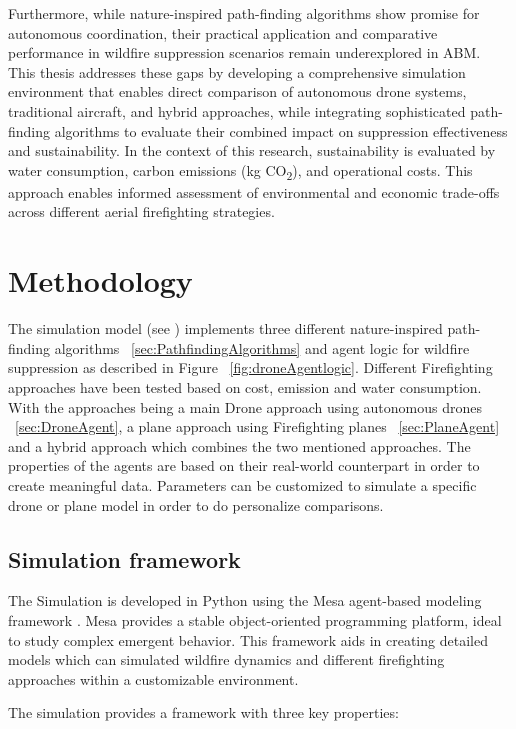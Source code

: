 \documentclass[twoside]{article}
\begin{document}
Furthermore, while nature-inspired path-finding algorithms show promise for autonomous coordination, their practical application and comparative performance in wildfire suppression scenarios remain underexplored in ABM. This thesis addresses these gaps by developing a comprehensive simulation environment that enables direct comparison of autonomous drone systems, traditional aircraft, and hybrid approaches, while integrating sophisticated path-finding algorithms to evaluate their combined impact on suppression effectiveness and sustainability.
In the context of this research, sustainability is evaluated by water consumption, carbon emissions (kg CO\textsubscript{2}), and operational costs. This approach enables informed assessment of environmental and economic trade-offs across different aerial firefighting strategies.

\section{Methodology}
\label{sec:Methodology}
The simulation model (see \citep{myCode}) implements three different nature-inspired path-finding algorithms ~\ref{sec:PathfindingAlgorithms} and agent logic for wildfire suppression as described in Figure ~\ref{fig:droneAgentlogic}. Different Firefighting approaches have been tested based on cost, emission and water consumption. With the approaches being a main Drone approach using autonomous drones ~\ref{sec:DroneAgent}, a plane approach using Firefighting planes ~\ref{sec:PlaneAgent} and a hybrid approach which combines the two mentioned approaches. The properties of the agents are based on their real-world counterpart in order to create meaningful data. Parameters can be customized to simulate a specific drone or plane model in order to do personalize comparisons. 

\subsection{Simulation framework}

The Simulation is developed in Python using the Mesa agent-based modeling framework \citep{terMesa}. Mesa provides a stable object-oriented programming platform, ideal to study complex emergent behavior. This framework aids in creating detailed models which can simulated wildfire dynamics and different firefighting approaches within a customizable environment.

The simulation provides a framework with three key properties:
\end{document}
